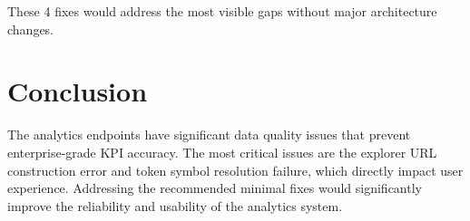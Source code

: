 \documentclass[11pt,a4paper]{article}
\begin{document}
These 4 fixes would address the most visible gaps without major architecture changes.

\section{Conclusion}

The analytics endpoints have significant data quality issues that prevent enterprise-grade KPI accuracy. The most critical issues are the explorer URL construction error and token symbol resolution failure, which directly impact user experience. Addressing the recommended minimal fixes would significantly improve the reliability and usability of the analytics system.
\end{document}
